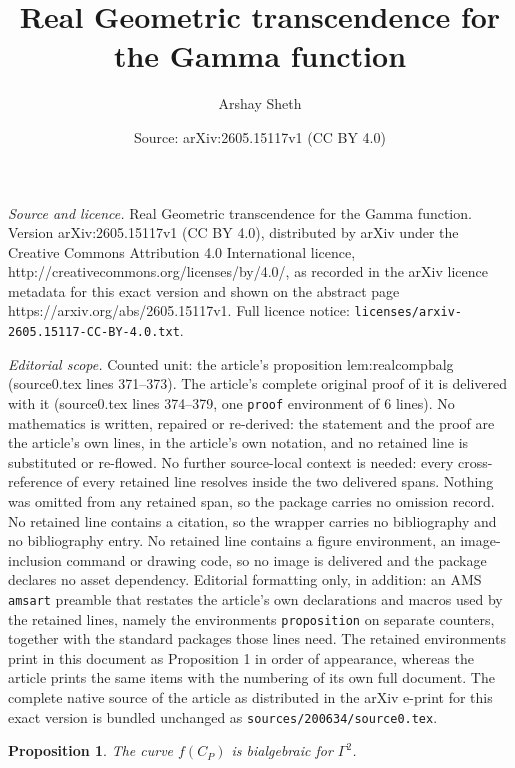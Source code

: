 \documentclass[10pt,a4paper]{amsart}
\title{Real Geometric transcendence for the Gamma function}
\author{Arshay Sheth}
\date{Source: arXiv:2605.15117v1 (CC BY 4.0)}
\newtheorem{proposition}{Proposition}
\begin{document}
\maketitle

\noindent\emph{Source and licence.} Real Geometric transcendence for the Gamma function. Version arXiv:2605.15117v1 (CC BY 4.0), distributed by arXiv under the Creative Commons Attribution 4.0 International licence, http://creativecommons.org/licenses/by/4.0/, as recorded in the arXiv licence metadata for this exact version and shown on the abstract page https://arxiv.org/abs/2605.15117v1. Full licence notice: \texttt{licenses/arxiv-2605.15117-CC-BY-4.0.txt}.\par\smallskip

\noindent\textit{Editorial scope.} Counted unit: the article's proposition lem:realcompbalg (source0.tex lines 371--373). The article's complete original proof of it is delivered with it (source0.tex lines 374--379, one \texttt{proof} environment of 6 lines). No mathematics is written, repaired or re-derived: the statement and the proof are the article's own lines, in the article's own notation, and no retained line is substituted or re-flowed.  No further source-local context is needed: every cross-reference of every retained line resolves inside the two delivered spans.  Nothing was omitted from any retained span, so the package carries no omission record.  No retained line contains a citation, so the wrapper carries no bibliography and no bibliography entry.  No retained line contains a figure environment, an image-inclusion command or drawing code, so no image is delivered and the package declares no asset dependency.  Editorial formatting only, in addition: an AMS \texttt{amsart} preamble that restates the article's own declarations and macros used by the retained lines, namely the environments \texttt{proposition} on separate counters, together with the standard packages those lines need.  The retained environments print in this document as Proposition 1 in order of appearance, whereas the article prints the same items with the numbering of its own full document.  The complete native source of the article as distributed in the arXiv e-print for this exact version is bundled unchanged as \texttt{sources/200634/source0.tex}.
\begin{proposition} \label{lem:realcompbalg}
The curve $f(C_P)$ is bialgebraic for $\Gamma^2$.
\end{proposition}
\end{document}
